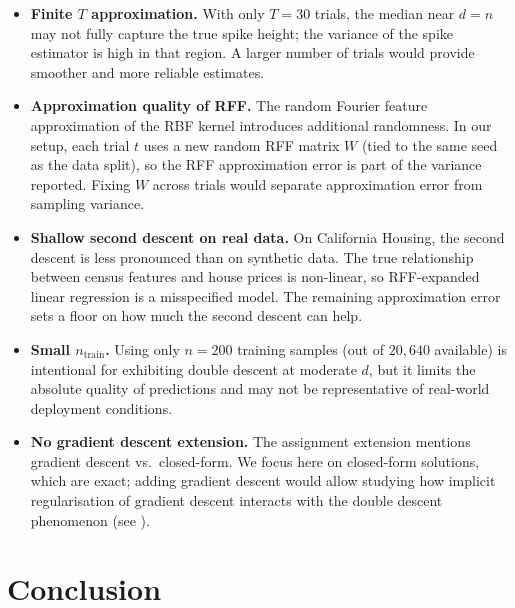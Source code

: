 \documentclass[11pt,a4paper]{article}
\begin{document}
\begin{itemize}
  \item \textbf{Finite $T$ approximation.}
        With only $T = 30$ trials, the median near $d = n$ may not fully capture the
        true spike height; the variance of the spike estimator is high in that region.
        A larger number of trials would provide smoother and more reliable estimates.

  \item \textbf{Approximation quality of RFF.}
        The random Fourier feature approximation of the RBF kernel introduces additional
        randomness.
        In our setup, each trial $t$ uses a new random RFF matrix $W$ (tied to the same
        seed as the data split), so the RFF approximation error is part of the variance
        reported.
        Fixing $W$ across trials would separate approximation error from sampling variance.

  \item \textbf{Shallow second descent on real data.}
        On California Housing, the second descent is less pronounced than on synthetic data.
        The true relationship between census features and house prices is non-linear, so
        RFF-expanded linear regression is a misspecified model.
        The remaining approximation error sets a floor on how much the second descent can help.

  \item \textbf{Small $n_{\mathrm{train}}$.}
        Using only $n = 200$ training samples (out of $20{,}640$ available) is intentional
        for exhibiting double descent at moderate $d$, but it limits the absolute quality of
        predictions and may not be representative of real-world deployment conditions.

  \item \textbf{No gradient descent extension.}
        The assignment extension mentions gradient descent vs.\ closed-form.
        We focus here on closed-form solutions, which are exact; adding gradient descent would
        allow studying how implicit regularisation of gradient descent interacts with the
        double descent phenomenon (see \cite{ali2019continuous}).
\end{itemize}


\section{Conclusion}
\label{sec:conclusion}
\end{document}
